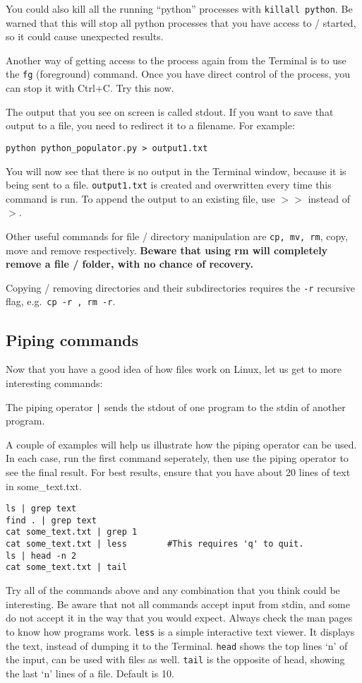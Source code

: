 \documentclass[a4paper]{article}
\begin{document}
You could also kill all the running ``python'' processes with \texttt{killall python}. Be warned that this will stop all python processes that you have access to / started, so it could cause unexpected results. 

Another way of getting access to the process again from the Terminal is to use the \texttt{fg} (foreground) command. Once you have direct control of the process, you can stop it with Ctrl+C. Try this now. 

The output that you see on screen is called stdout. If you want to save that output to a file, you need to redirect it to a filename. For example: 
\begin{lstlisting}
python python_populator.py > output1.txt
\end{lstlisting}

You will now see that there is no output in the Terminal window, because it is being sent to a file. \texttt{output1.txt} is created and overwritten every time this command is run. To append the output to an existing file, use $>>$ instead of $>$. 

Other useful commands for file / directory manipulation are
\texttt{cp, mv, rm}, copy, move and remove respectively. \textbf{Beware that using rm will completely remove a file / folder, with no chance of recovery.}

Copying / removing directories and their subdirectories requires the \texttt{-r} recursive flag, e.g.\ \texttt{cp -r , rm -r}.



\subsection{Piping commands}

Now that you have a good idea of how files work on Linux, let us get to more interesting commands: 

The piping operator \texttt{|} sends the stdout of one program to the stdin of another program. 

A couple of examples will help us illustrate how the piping operator can be used. In each case, run the first command seperately, then use the piping operator to see the final result. For best results, ensure that you have about 20 lines of text in some\_text.txt. 

\begin{lstlisting}
ls | grep text
find . | grep text
cat some_text.txt | grep 1
cat some_text.txt | less		#This requires 'q' to quit.
ls | head -n 2
cat some_text.txt | tail
\end{lstlisting}
Try all of the commands above and any combination that you think could be interesting. Be aware that not all commands accept input from stdin, and some do not accept it in the way that you would expect. Always check the man pages to know how programs work. 
\texttt{less} is a simple interactive text viewer. It displays the text, instead of dumping it to the Terminal. 
\texttt{head} shows the top lines `n' of the input, can be used with files as well. 
\texttt{tail} is the opposite of head, showing the last `n' lines of a file. Default is 10. 
\end{document}
